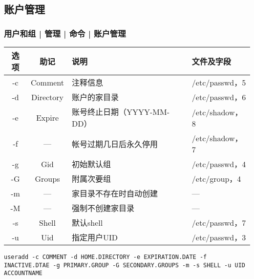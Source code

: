 \subsection{账户管理}
\begin{frame}[fragile]
  \frametitle{用户和组 | 管理 | 命令 | 账户管理}
  \vspace{-1em}
  \begin{table}
    \centering
    \begin{tabular}{ccll}
      \hline
      \rowcolor{blue!50}\alert{选项} & 助记 & 说明 & 文件及字段\\
      \hline
      -c & Comment & 注释信息 & /etc/passwd，5\\
      -d & Directory & 账户的家目录 & /etc/passwd，6\\
      -e & Expire & 账号终止日期（YYYY-MM-DD） & /etc/shadow，8\\
      -f & --- & 帐号过期几日后永久停用 & /etc/shadow，7\\
      -g & Gid & 初始默认组 & /etc/passwd，4\\
      -G & Groups & 附属次要组 & /etc/group，4\\
      -m & --- & 家目录不存在时自动创建 & ---\\
      -M & --- & 强制不创建家目录 & ---\\
      -s & Shell & 默认shell & /etc/passwd，7\\
      -u & Uid & 指定用户UID & /etc/passwd，3\\
      \hline
    \end{tabular}
  \end{table}
  \pause
  \vspace{-0.5em}
\begin{lstlisting}
useradd -c COMMENT -d HOME.DIRECTORY -e EXPIRATION.DATE -f INACTIVE.DTAE -g PRIMARY.GROUP -G SECONDARY.GROUPS -m -s SHELL -u UID ACCOUNTNAME
\end{lstlisting}
\end{frame}

